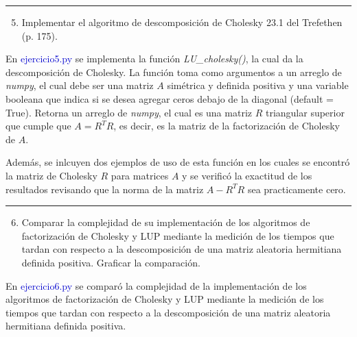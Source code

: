 \vspace{5mm}
{\color{lightgray} \hrule}
\begin{enumerate} \setcounter{enumi}{4}
	\item Implementar el algoritmo de descomposición de Cholesky 23.1 del Trefethen (p. 175).
\end{enumerate}

En \textcolor{mediumblue}{ejercicio5.py} se implementa la función \textit{LU\_cholesky()}, la cual da la descomposición de Cholesky. La función toma como argumentos a un arreglo de \textit{numpy}, el cual debe ser una matriz $A$ simétrica y definida positiva y una variable booleana que indica si se desea agregar ceros debajo de la diagonal (default = True). Retorna un arreglo de \textit{numpy}, el cual es una matriz $R$ triangular superior que cumple que $A = R^{T}R$, es decir, es la matriz de la factorización de Cholesky de $A$.

Además, se inlcuyen dos ejemplos de uso de esta función en los cuales se encontró la matriz de Cholesky $R$ para matrices $A$ y se verificó la exactitud de los resultados revisando que la norma de la matriz $A - R^{T}R$ sea practicamente cero.

\vspace{5mm}
{\color{lightgray} \hrule}
\begin{enumerate} \setcounter{enumi}{5}
	\item Comparar la complejidad de su implementación de los algoritmos de factorización de Cholesky y LUP mediante la medición de los tiempos que tardan con respecto a la descomposición de una matriz aleatoria hermitiana definida positiva. Graficar la comparación.
\end{enumerate}

En \textcolor{mediumblue}{ejercicio6.py} se comparó la complejidad de la implementación de los algoritmos de factorización de Cholesky y LUP mediante la medición de los tiempos que tardan con respecto a la descomposición de una matriz aleatoria hermitiana definida positiva. 

